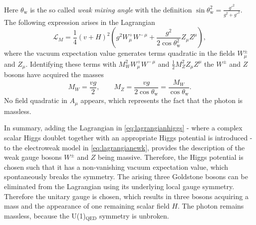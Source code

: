 Here $\theta_\text{w}$ is the so called \emph{weak mixing angle} with the definition $\sin\theta_\text{w}^2 = \frac{g'^2}{g^2+g'^2}$.
The following expression arises in the Lagrangian %
\begin{equation}
  \mathcal{L}_M = \frac{1}{4} \left( v + H \right)^2  \left(g^2 W_\mu^+W^{-\,\mu} + \frac{g^2}{2\cos\theta_\text{w}^2} Z_\mu Z^\mu \right),
  \label{eq:lagrangianmasses}
\end{equation}
where the vacuum expectation value generates terms quadratic in the fields $W_\mu^\pm$ and $Z_\mu$. Identifying these terms with $M_W^2 W_\mu^+W^{-\,\mu}$ and $\frac{1}{2} M_Z^2 Z_\mu Z^\mu$ the $W^\pm$ and $Z$ bosons have acquired the masses
\begin{equation}
  M_W = \frac{v g}{2}, \qquad  
  M_Z = \frac{v g}{2\cos\theta_\text{w}} = \frac{M_W}{\cos\theta_\text{w}}.
\end{equation}
No field quadratic in $A_\mu$ appears, which represents the fact that the photon is massless.

In summary, adding the Lagrangian in \cref{eq:lagrangianhiggs} - where a complex scalar Higgs doublet together with an appropriate Higgs potential is introduced - to the electroweak model in \cref{eq:lagrangianewk}, provides the description of the weak gauge bosons $W^\pm$ and $Z$ being massive.
Therefore, the Higgs potential is chosen such that it has a non-vanishing vacuum expectation value, which spontaneously breaks the symmetry. The arising three Goldstone bosons can be eliminated from the Lagrangian using its underlying local gauge symmetry. Therefore the unitary gauge is chosen, which results in three bosons acquiring a mass and the appearance of one remaining scalar field $H$. The photon remains massless, because the U(1)$_{\text{QED}}$ symmetry is unbroken.


